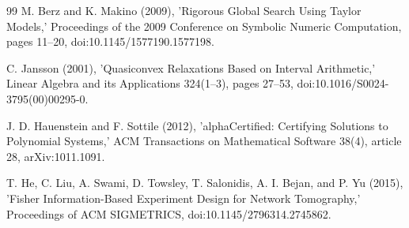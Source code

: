 \documentclass{article}
\begin{document}
\begin{thebibliography}{99}
   M. Berz and K. Makino (2009), 'Rigorous Global Search Using Taylor Models,' Proceedings of the 2009 Conference on Symbolic Numeric Computation, pages 11--20, doi:10.1145/1577190.1577198.

   C. Jansson (2001), 'Quasiconvex Relaxations Based on Interval Arithmetic,' Linear Algebra and its Applications 324(1--3), pages 27--53, doi:10.1016/S0024-3795(00)00295-0.

   J. D. Hauenstein and F. Sottile (2012), 'alphaCertified: Certifying Solutions to Polynomial Systems,' ACM Transactions on Mathematical Software 38(4), article 28, arXiv:1011.1091.

   T. He, C. Liu, A. Swami, D. Towsley, T. Salonidis, A. I. Bejan, and P. Yu (2015), 'Fisher Information-Based Experiment Design for Network Tomography,' Proceedings of ACM SIGMETRICS, doi:10.1145/2796314.2745862.

\end{thebibliography}
\end{document}
